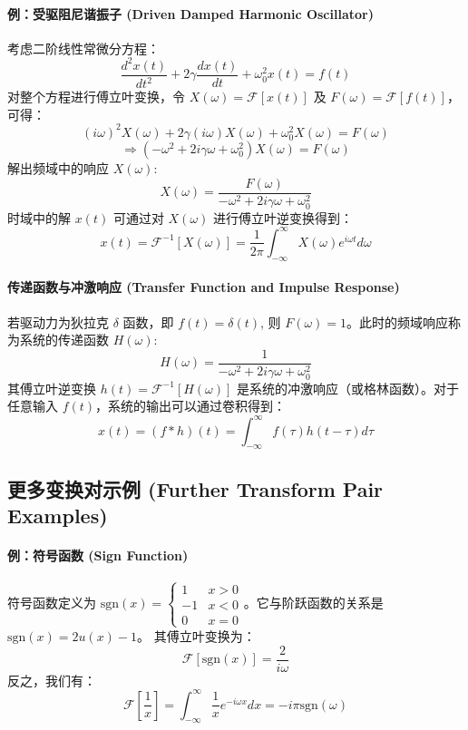\documentclass{article}
\begin{document}
	\paragraph{例：受驱阻尼谐振子 (Driven Damped Harmonic Oscillator)}
	考虑二阶线性常微分方程：
	$$ 
	\frac{d^2x(t)}{dt^2} + 2\gamma\frac{dx(t)}{dt} + \omega_0^2 x(t) = f(t) 
	$$
	对整个方程进行傅立叶变换，令 $X(\omega)=\mathcal{F}[x(t)]$ 及 $F(\omega)=\mathcal{F}[f(t)]$，可得：
	$$ 
	(i\omega)^2 X(\omega) + 2\gamma(i\omega)X(\omega) + \omega_0^2 X(\omega) = F(\omega) 
	$$
	$$ 
	\Rightarrow (-\omega^2 + 2i\gamma\omega + \omega_0^2) X(\omega) = F(\omega) 
	$$
	解出频域中的响应 $X(\omega)$:
	$$ 
	X(\omega) = \frac{F(\omega)}{-\omega^2 + 2i\gamma\omega + \omega_0^2} 
	$$
	时域中的解 $x(t)$ 可通过对 $X(\omega)$ 进行傅立叶逆变换得到：
	$$ 
	x(t) = \mathcal{F}^{-1}[X(\omega)] = \frac{1}{2\pi} \int_{-\infty}^{\infty} X(\omega) e^{i\omega t} d\omega 
	$$
	
	\paragraph{传递函数与冲激响应 (Transfer Function and Impulse Response)}
	若驱动力为狄拉克 $\delta$ 函数，即 $f(t)=\delta(t)$, 则 $F(\omega)=1$。此时的频域响应称为系统的传递函数 $H(\omega)$:
	$$ 
	H(\omega) = \frac{1}{-\omega^2 + 2i\gamma\omega + \omega_0^2} 
	$$
	其傅立叶逆变换 $h(t) = \mathcal{F}^{-1}[H(\omega)]$ 是系统的冲激响应（或格林函数）。对于任意输入 $f(t)$，系统的输出可以通过卷积得到：
	$$ 
	x(t) = (f * h)(t) = \int_{-\infty}^{\infty} f(\tau) h(t-\tau) d\tau 
	$$
	
	\subsection{更多变换对示例 (Further Transform Pair Examples)}
	
	\paragraph{例：符号函数 (Sign Function)}
	符号函数定义为 $\text{sgn}(x) = \begin{cases} 1 & x>0 \\ -1 & x<0 \\ 0 & x=0 \end{cases}$。它与阶跃函数的关系是 $\text{sgn}(x) = 2u(x) - 1$。
	其傅立叶变换为：
	$$ 
	\mathcal{F}[\text{sgn}(x)] = \frac{2}{i\omega} 
	$$
	反之，我们有：
	$$ 
	\mathcal{F}\left[\frac{1}{x}\right] = \int_{-\infty}^{\infty} \frac{1}{x} e^{-i\omega x} dx = -i\pi \text{sgn}(\omega) 
	$$
	
\end{document}
